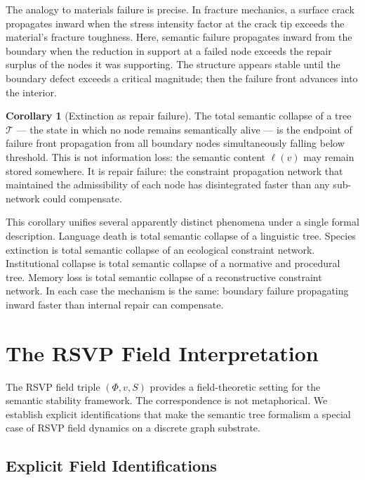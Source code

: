 \documentclass[11pt, a4paper]{article}
\theoremstyle{definition}
\newtheorem{corollary}{Corollary}
\theoremstyle{remark}
\begin{document}
The analogy to materials failure is precise. In fracture mechanics, a surface
crack propagates inward when the stress intensity factor at the crack tip
exceeds the material's fracture toughness. Here, semantic failure propagates
inward from the boundary when the reduction in support at a failed node exceeds
the repair surplus of the nodes it was supporting. The structure appears stable
until the boundary defect exceeds a critical magnitude; then the failure front
advances into the interior.

\begin{corollary}[Extinction as repair failure]
The total semantic collapse of a tree $\mathcal{T}$ --- the state in which
no node remains semantically alive --- is the endpoint of failure front
propagation from all boundary nodes simultaneously falling below threshold.
This is not information loss: the semantic content $\ell(v)$ may remain
stored somewhere. It is repair failure: the constraint propagation network
that maintained the admissibility of each node has disintegrated faster than
any sub-network could compensate.
\end{corollary}

This corollary unifies several apparently distinct phenomena under a single
formal description. Language death is total semantic collapse of a linguistic
tree. Species extinction is total semantic collapse of an ecological constraint
network. Institutional collapse is total semantic collapse of a normative and
procedural tree. Memory loss is total semantic collapse of a reconstructive
constraint network. In each case the mechanism is the same: boundary failure
propagating inward faster than internal repair can compensate.

\section{The RSVP Field Interpretation}

The RSVP field triple $(\Phi, v, S)$ provides a field-theoretic setting for
the semantic stability framework. The correspondence is not metaphorical. We
establish explicit identifications that make the semantic tree formalism a
special case of RSVP field dynamics on a discrete graph substrate.

\subsection{Explicit Field Identifications}
\end{document}
